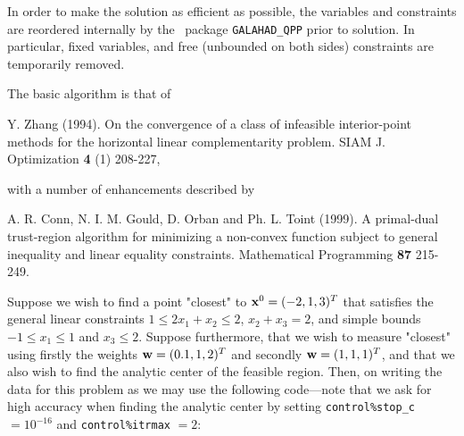 \documentclass{galahad}
\begin{document}
In order to make the solution as efficient as possible, the
variables and constraints are reordered internally
by the \galahad\ package {\tt GALAHAD\_QPP} prior to solution.
In particular, fixed variables, and
free (unbounded on both sides) constraints are temporarily removed.
\vspace*{1mm}

\galreferences
\vspace*{1mm}

\noindent
The basic algorithm is that of
\vspace*{1mm}

\noindent
Y. Zhang (1994).
On the convergence of a class of infeasible interior-point methods for the
horizontal linear complementarity problem.
SIAM J. Optimization {\bf 4} (1) 208-227,
\vspace*{1mm}

\noindent
with a number of enhancements described by
\vspace*{1mm}

\noindent
A. R. Conn, N. I. M. Gould, D. Orban and Ph. L. Toint (1999).
A primal-dual trust-region algorithm for minimizing a non-convex
function subject to general inequality and linear equality constraints.
Mathematical Programming {\bf 87} 215-249.


\galexample
Suppose we wish to find a point "closest" to
${\mathbf{x}}^{0}  =  ( -2, 1, 3 )^{T}$
that satisfies the general linear constraints
$1 \leq  2 x_{1}  +  x_{2}  \leq  2$,
$x_{2}  +  x_{3}  =  2$, and simple bounds
$-1  \leq  x_{1}  \leq  1$ and $x_{3}  \leq  2$.
Suppose furthermore, that we wish to measure "closest" using
firstly the weights ${\mathbf{w}}  =  ( 0.1, 1, 2 )^{T}$
and secondly ${\mathbf{w}}  =  ( 1, 1, 1 )^{T}$, and that we also
wish to find the analytic center of the feasible region.
Then, on writing the data for this problem as
we may use the following code---note that we ask for high accuracy
when finding the analytic center by setting
{\tt control\%stop\_c} $= 10^{-16}$ and {\tt control\%itrmax} $= 2$:
\end{document}
